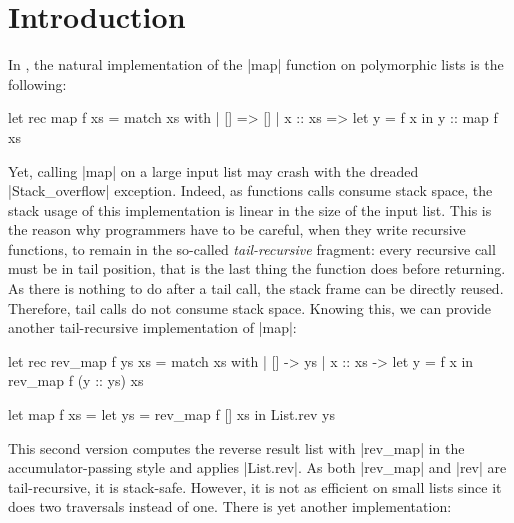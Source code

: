 \section{Introduction}

In \OCamlLang, the natural implementation of the \ocaml|map| function on polymorphic lists is the following:

\begin{OCaml}
let rec map f xs =
  match xs with
  | [] =>
      []
  | x :: xs =>
      let y = f x in
      y :: map f xs
\end{OCaml}

Yet, calling \ocaml|map| on a large input list may crash with the dreaded \ocaml|Stack_overflow| exception.
%
Indeed, as functions calls consume stack space, the stack usage of this implementation is linear in the size of the input list.
%
This is the reason why \OCamlLang programmers have to be careful, when they write recursive functions, to remain in the so-called \emph{tail-recursive} fragment: every recursive call must be in tail position, that is the last thing the function does before returning.
%
As there is nothing to do after a tail call, the stack frame can be directly reused.
%
Therefore, tail calls do not consume stack space.
%
Knowing this, we can provide another tail-recursive implementation of \ocaml|map|:

\begin{minipage}{0.5\linewidth}
\begin{OCaml}
let rec rev_map f ys xs =
  match xs with
  | [] ->
      ys
  | x :: xs ->
      let y = f x in
      rev_map f (y :: ys) xs
\end{OCaml}
\end{minipage}
\hfill
\begin{minipage}{0.5\linewidth}
\begin{OCaml}
let map f xs =
  let ys = rev_map f [] xs in
  List.rev ys
\end{OCaml}
\end{minipage}

This second version computes the reverse result list with \ocaml|rev_map| in the accumulator-passing style and applies \ocaml|List.rev|.
%
As both \ocaml|rev_map| and \ocaml|rev| are tail-recursive, it is stack-safe.
%
However, it is not as efficient on small lists since it does two traversals instead of one.
%
There is yet another implementation:

